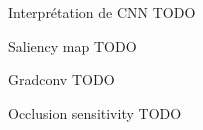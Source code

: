 \begin{frame}{Interprétation de CNN}
  \alert{TODO}
\end{frame}

\begin{frame}{Saliency map}
    \alert{TODO}
\end{frame}

\begin{frame}{Gradconv}
    \alert{TODO}
\end{frame}

\begin{frame}{Occlusion sensitivity}
  \alert{TODO}
\end{frame}
  